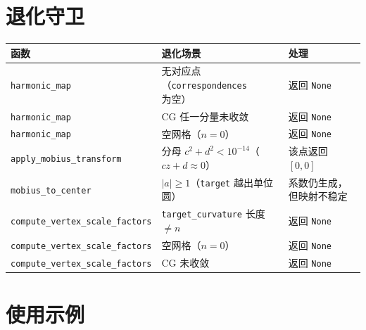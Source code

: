 \documentclass[11pt,a4paper]{article}
\begin{document}
\section{退化守卫}

\begin{center}
\renewcommand{\arraystretch}{1.18}
\begin{tabular}{@{}lll@{}}
  \toprule
  \textbf{函数} & \textbf{退化场景} & \textbf{处理} \\
  \midrule
  \texttt{harmonic\_map}                & 无对应点（\texttt{correspondences} 为空） & 返回 \texttt{None} \\
  \texttt{harmonic\_map}                & CG 任一分量未收敛                          & 返回 \texttt{None} \\
  \texttt{harmonic\_map}                & 空网格（$n=0$）                            & 返回 \texttt{None} \\
  \texttt{apply\_mobius\_transform}     & 分母 $c^2+d^2 < 10^{-14}$（$cz+d\approx 0$） & 该点返回 $[0,0]$ \\
  \texttt{mobius\_to\_center}           & $|a| \ge 1$（\texttt{target} 越出单位圆）   & 系数仍生成，但映射不稳定 \\
  \texttt{compute\_vertex\_scale\_factors} & \texttt{target\_curvature} 长度 $\neq n$ & 返回 \texttt{None} \\
  \texttt{compute\_vertex\_scale\_factors} & 空网格（$n=0$）                         & 返回 \texttt{None} \\
  \texttt{compute\_vertex\_scale\_factors} & CG 未收敛                              & 返回 \texttt{None} \\
  \bottomrule
\end{tabular}
\end{center}

\section{使用示例}
\end{document}
